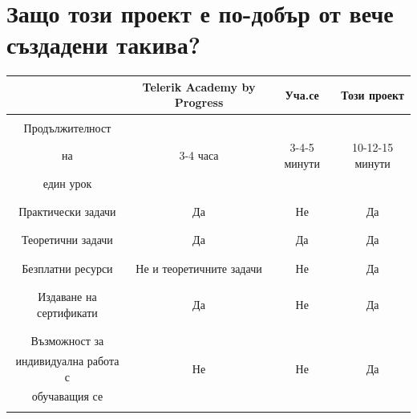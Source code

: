 \documentclass[12pt]{article}
\begin{document}
	\section{Защо този проект е по-добър от вече създадени такива?}
	\begin{table}[ht]
		\centering
		\resizebox{\textwidth}{!}
		{
			\begin{tabular}{c|c|c|c}
				& \foreignlanguage{english}{Telerik Academy by Progress} & Уча.се & Този проект\\
				\hline
				& & &\\
				Продължителност & & & \\ 
				на & 3-4 часа & 3-4-5 минути & 10-12-15 минути \\ 
				един урок & & &\\
				& & &\\
				\hline
				& & &\\
				Практически задачи & Да & Не & Да \\ 
				& & &\\
				\hline
				& & &\\
				Теоретични задачи & Да & Да & Да \\ 
				& & &\\
				\hline
				& & &\\
				Безплатни ресурси & Не и теоретичните задачи & Не & Да \\ 
				& & &\\
				\hline
				& & &\\
				Издаване на сертификати & Да & Не & Да \\
				& & &\\
				\hline
				& & &\\
				Възможност за & & & \\ 
				индивидуална работа с & Не & Не & Да \\
				обучаващия се & & &\\ 
				& & &\\
				\hline
				
			\end{tabular}
		}
	\end{table}
	\newpage
\end{document}
